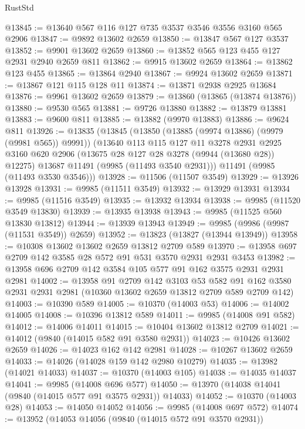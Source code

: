 \begin{lexlean}{RustStd}
\begin{coremodule}
@13845 := @13640 @567 @116 @127 @735 @3537 @3546 @3556 @3160 @565 @2906
@13847 := @9892 @13602 @2659
@13850 := @13847 @567 @127 @3537
@13852 := @9901 @13602 @2659
@13860 := @13852 @565 @123 @455 @127 @2931 @2940 @2659 @811
@13862 := @9915 @13602 @2659
@13864 := @13862 @123 @455
@13865 := @13864 @2940
@13867 := @9924 @13602 @2659
@13871 := @13867 @121 @115 @128 @11
@13874 := @13871 @2938 @2925 @13684
@13876 := @9961 @13602 @2659
@13879 := @13860 (@13865 (@13874 @13876))
@13880 := @9530 @565
@13881 := @9726 @13880
@13882 := @13879 @13881
@13883 := @9600 @811
@13885 := @13882 (@9970 @13883)
@13886 := @9624 @811
@13926 := @13835
    (@13845
      (@13850 (@13885 (@9974 @13886) (@9979 (@9981 @565)) @9991))
      (@13640
        @113
        @115
        @127
        @11
        @3278
        @2931
        @2925
        @3160
        @620
        @2906
        (@13675 @28 @127 @28 @3278 (@9944 (@13680 @28)) @12275)
        @13687
        @11491
        (@9985 (@11493 @3540 @2931)))
      @11491
      (@9985 (@11493 @3530 @3546)))
@13928 := @11506 (@11507 @3549)
@13929 := @13926 @13928
@13931 := @9985 (@11511 @3549)
@13932 := @13929 @13931
@13934 := @9985 (@11516 @3549)
@13935 := @13932 @13934
@13938 := @9985 (@11520 @3549 @13830)
@13939 := @13935 @13938
@13943 := @9985 (@11525 @560 @13830 @13812)
@13944 := @13939 @13943
@13949 := @9985 (@9986 (@9987 (@11531 @3549)) @2659)
@13952 := @13823 (@13827 (@13944 @13949))
@13958 := @10308 @13602 @13602 @2659 @13812 @2709 @589
@13970 := @13958 @697 @2709 @142 @3585 @28 @572 @91 @531 @3570 @2931 @2931 @3453
@13982 := @13958 @696 @2709 @142 @3584 @105 @577 @91 @162 @3575 @2931 @2931 @2981
@14002 := @13958
    @91
    @2709
    @142
    @3103
    @53
    @582
    @91
    @162
    @3580
    @2931
    @2931
    @2981
    (@10360 @13602 @2659 @13812 @2709 @589 @2709 @142)
@14003 := @10390 @589
@14005 := @10370 (@14003 @53)
@14006 := @14002 @14005
@14008 := @10396 @13812 @589
@14011 := @9985 (@14008 @91 @582)
@14012 := @14006 @14011
@14015 := @10404 @13602 @13812 @2709
@14021 := @14012 (@9840 (@14015 @582 @91 @3580 @2931))
@14023 := @10426 @13602 @2659
@14026 := @14023 @162 @142 @2981
@14028 := @10267 @13602 @2659
@14033 := @14026 (@14028 @159 @142 @2980 @10279)
@14035 := @13982 (@14021 @14033)
@14037 := @10370 (@14003 @105)
@14038 := @14035 @14037
@14041 := @9985 (@14008 @696 @577)
@14050 := @13970 (@14038 @14041 (@9840 (@14015 @577 @91 @3575 @2931)) @14033)
@14052 := @10370 (@14003 @28)
@14053 := @14050 @14052
@14056 := @9985 (@14008 @697 @572)
@14074 := @13952
    (@14053
      @14056
      (@9840 (@14015 @572 @91 @3570 @2931))

\end{coremodule}
\end{lexlean}
